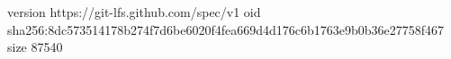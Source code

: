version https://git-lfs.github.com/spec/v1
oid sha256:8dc573514178b274f7d6be6020f4fea669d4d176c6b1763e9b0b36e27758f467
size 87540
